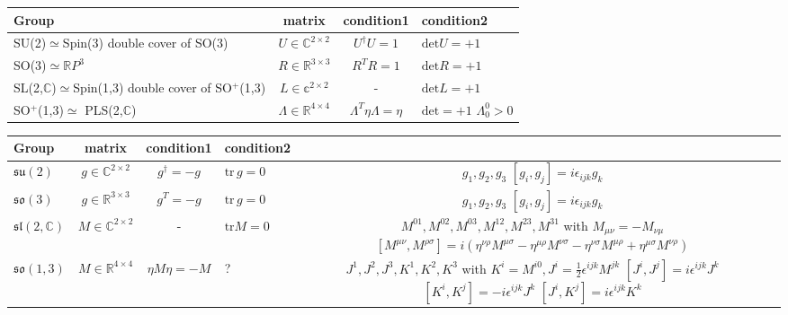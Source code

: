 \documentclass[../main.tex]{subfiles}
\begin{document}
\begin{itemize}
\begin{center}
\begin{tabular}{|l|c|c|l|}
\hline
Group & matrix & condition1 & condition2 \\ 
\hline
\shortstack{SU(2)$\simeq$Spin(3)\\double cover of SO(3)} & $U\in\mathbb{C}^{2\times2} $ & $U^\dagger U=1$ & $\text{det}U=+1$ \\ \hline
SO(3)$\simeq\mathbb{R}P^3$             & $R\in\mathbb{R}^{3\times3} $ & $R^TR=1$ & $\text{det}R=+1$ \\ \hline
\shortstack{SL(2,$\mathbb{C}$)$\simeq$Spin(1,3)\\double cover of SO$^+$(1,3)}  & $L\in\mathbb{c}^{2\times2}$ & - & $\text{det}L=+1$ \\ \hline
SO$^+$(1,3)$\simeq$ PLS(2,$\mathbb{C}$) & $\Lambda\in\mathbb{R}^{4\times4}$ & $\Lambda^T\eta\Lambda=\eta$ &\shortstack{ $\text{det}=+1$ \\$\Lambda^0_0>0$}\\ \hline
\end{tabular}
\end{center}

\begin{center}
\begin{tabular}{|l|c|c|l|c|l|}
\hline
Group & matrix & condition1 & condition2 \\  \hline
$\mathfrak{su}(2)$ & $g\in\mathbb{C}^{2\times2} $ & $g^\dagger=-g$ & $\text{tr}\,g=0$ & \shortstack{$g_{1}, g_{2}, g_{3}$\\ $[g_i,g_j]=i\epsilon_{ijk}g_k$}\\ \hline
$\mathfrak{so}(3)$ & $g\in\mathbb{R}^{3\times3} $ & $g^T=-g$ & $\text{tr}\,g=0$ & \shortstack{$g_{1}, g_{2}, g_{3}$\\ $[g_i,g_j]=i\epsilon_{ijk}g_k$}\\ \hline
$\mathfrak{sl}(2,\mathbb{C})$ & $M\in\mathbb{C}^{2\times2} $ & - & $\text{tr} M=0$ & \shortstack{$M^{01},M^{02},M^{03},M^{12},M^{23},M^{31}$ with $M_{\mu\nu}=-M_{\nu\mu}$\\$[M^{\mu\nu},M^{\rho\sigma}]=i(\eta^{\nu\rho}M^{\mu\sigma}-\eta^{\mu\rho}M^{\nu\sigma}-\eta^{\nu\sigma}M^{\mu\rho}+\eta^{\mu\sigma}M^{\nu\rho})$} \\ \hline
$\mathfrak{so}(1,3)$ & $M\in\mathbb{R}^{4\times4} $ & $\eta M\eta=-M$ & ? & \shortstack{$J^1, J^2, J^3, K^1, K^2, K^3$\\ with $K^i=M^{i0}, J^i=\frac{1}{2}\epsilon^{ijk}M^{jk}$\\$[J^i,J^j]=i\epsilon^{ijk}J^k$\\$[K^i,K^j]=-i\epsilon^{ijk}J^k$ \\$[J^i,K^j]=i\epsilon^{ijk}K^k$}  \\ \hline
\end{tabular}
\end{center}


\end{itemize}
\end{document}
